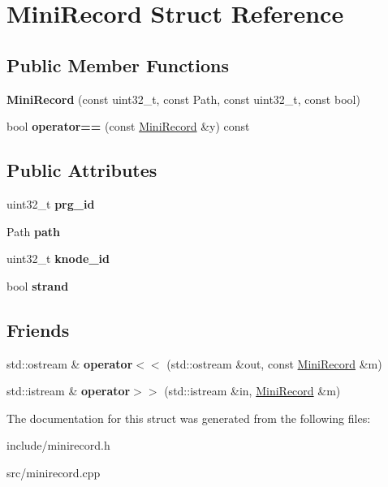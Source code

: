 \hypertarget{structMiniRecord}{}\section{Mini\+Record Struct Reference}
\label{structMiniRecord}
\subsection*{Public Member Functions}
\begin{DoxyCompactItemize}
\item 
\mbox{\label{structMiniRecord_a768a1f3044350283ca5f25d7032985ed}} 
{\bfseries Mini\+Record} (const uint32\+\_\+t, const Path, const uint32\+\_\+t, const bool)
\item 
\mbox{\label{structMiniRecord_ab7056477df9b306a890ee80096485b47}} 
bool {\bfseries operator==} (const \hyperlink{structMiniRecord}{Mini\+Record} \&y) const
\end{DoxyCompactItemize}
\subsection*{Public Attributes}
\begin{DoxyCompactItemize}
\item 
\mbox{\label{structMiniRecord_aef0452bf5833638a93af53bdac3c898c}} 
uint32\+\_\+t {\bfseries prg\+\_\+id}
\item 
\mbox{\label{structMiniRecord_aa890b6bfa4a505214aa50f9f70f91b5d}} 
Path {\bfseries path}
\item 
\mbox{\label{structMiniRecord_a97e2c87da5af20abad25c2c08036bb3a}} 
uint32\+\_\+t {\bfseries knode\+\_\+id}
\item 
\mbox{\label{structMiniRecord_a76c6269939e525768647df5751afd019}} 
bool {\bfseries strand}
\end{DoxyCompactItemize}
\subsection*{Friends}
\begin{DoxyCompactItemize}
\item 
\mbox{\label{structMiniRecord_adf1a022fece5080694a3eddd02925038}} 
std\+::ostream \& {\bfseries operator$<$$<$} (std\+::ostream \&out, const \hyperlink{structMiniRecord}{Mini\+Record} \&m)
\item 
\mbox{\label{structMiniRecord_a5d9e09fdb821d377589ebb60a846089b}} 
std\+::istream \& {\bfseries operator$>$$>$} (std\+::istream \&in, \hyperlink{structMiniRecord}{Mini\+Record} \&m)
\end{DoxyCompactItemize}


The documentation for this struct was generated from the following files\+:\begin{DoxyCompactItemize}
\item 
include/minirecord.\+h\item 
src/minirecord.\+cpp\end{DoxyCompactItemize}
